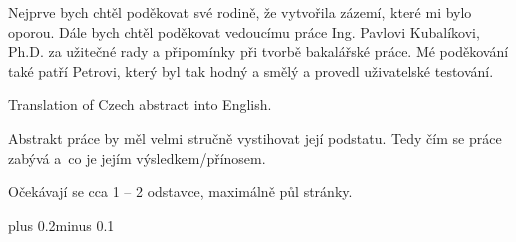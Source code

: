 \documentclass[11pt,twoside,a4paper]{book}
\begin{document}

\coverpagestarts


\acknowledgements
\noindent

Nejprve bych chtěl poděkovat své rodině, že vytvořila zázemí, které mi bylo oporou. Dále bych chtěl poděkovat vedoucímu práce Ing. Pavlovi Kubalíkovi, Ph.D. za užitečné rady a připomínky při tvorbě bakalářské práce. Mé poděkování také patří Petrovi, který byl tak hodný a smělý a provedl uživatelské testování.






 
\abstractpage

Translation of Czech abstract into English.


\baselineskip

\noindent
Abstrakt práce by měl velmi stručně vystihovat její podstatu. Tedy čím se práce zabývá a~co je jejím výsledkem/přínosem.

\noindent
Očekávají se cca 1 -- 2 odstavce, maximálně půl stránky.


\tableofcontents



\listoffigures



\listoftables



\mainbodystarts
\normalfont
{}\baselineskip plus 0.2\baselineskip minus 0.1\baselineskip
\end{document}
